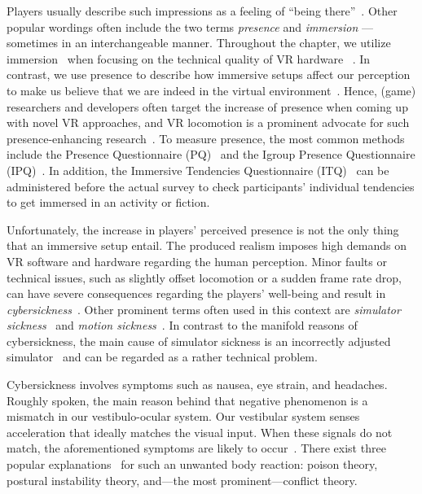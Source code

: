 Players usually describe such impressions as a feeling of ``being there''~\cite{heeter1992being,lombard1997heart}. Other popular wordings often include the two terms \textit{presence} and \textit{immersion} --- sometimes in an interchangeable manner. Throughout the chapter, we utilize immersion~\cite{cairns2014immersion} when focusing on the technical quality of VR hardware ~\cite{Biocca:1995:IVR:207922.207926, sherman2002understanding}. In contrast, we use presence to describe how immersive setups affect our perception to make us believe that we are indeed in the virtual environment~\cite{slater2003note}. Hence, (game) researchers and developers often target the increase of presence when coming up with novel VR approaches, and VR locomotion is a prominent advocate for such presence-enhancing research~\cite{slater1995taking}. To measure presence, the most common methods include the Presence Questionnaire (PQ)~\cite{Witmer.2005} and the Igroup Presence Questionnaire (IPQ)~\cite{Schubert.2003, Schubert.2018}. In addition, the Immersive Tendencies Questionnaire (ITQ)~\cite{witmer1998measuring} can be administered before the actual survey to check participants' individual tendencies to get immersed in an activity or fiction. 


Unfortunately, the increase in players' perceived presence is not the only thing that an immersive setup entail. The produced realism imposes high demands on VR software and hardware regarding the human perception. Minor faults or technical issues, such as slightly offset locomotion or a sudden frame rate drop, can have severe consequences regarding the players' well-being and result in \textit{cybersickness}~\cite{stanney1997cybersickness,laviola2000discussion}. Other prominent terms often used in this context are \textit{simulator sickness}~\cite{kolasinski1995simulator} and \textit{motion sickness}~\cite{money1970motion,hettinger1992visually,ohyama2007autonomic}. In contrast to the manifold reasons of cybersickness, the main cause of simulator sickness is an incorrectly adjusted simulator~\cite{kennedy1989simulator} and can be regarded as a rather technical problem.




Cybersickness involves symptoms such as nausea, eye strain, and headaches. Roughly spoken, the main reason behind that negative phenomenon is a mismatch in our vestibulo-ocular system. Our vestibular system senses acceleration that ideally matches the visual input. When these signals do not match, the aforementioned symptoms are likely to occur~\cite{reason1975motion}. There exist three popular explanations~\cite{laviola2000discussion} for such an unwanted body reaction: poison theory, postural instability theory, and---the most prominent---conflict theory.  


